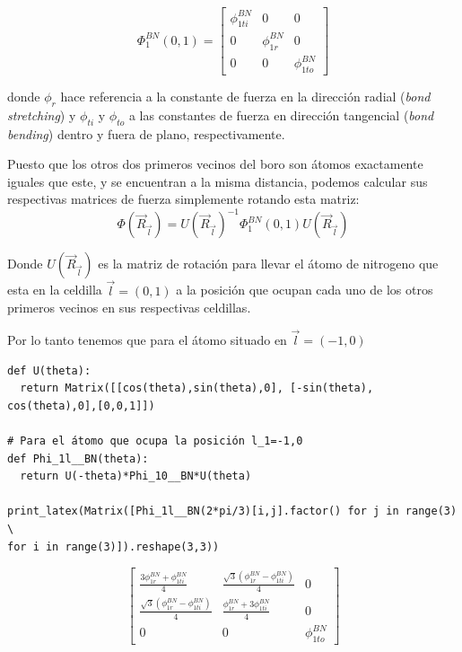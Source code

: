 \documentclass[12pt,a4paper]{article}
\begin{document}
\begin{equation}\Phi_1^{BN}(0,1)= \left[\begin{matrix}\phi^{BN}_{1ti} & 0 & 0\\0 & \phi^{BN}_{1r} & 0\\0 & 0 & \phi^{BN}_{1to}\end{matrix}\right] \end{equation}
\vspace{0.7cm}



donde \(\phi_r\) hace referencia a la constante de fuerza en la dirección radial (\emph{bond stretching}) y \(\phi_{ti}\) y \(\phi_{to}\) a las constantes de fuerza en dirección tangencial (\emph{bond bending}) dentro y fuera de plano, respectivamente.

Puesto que los otros dos primeros vecinos del boro son átomos exactamente iguales que este, y se encuentran a la misma distancia, podemos calcular sus respectivas matrices de fuerza simplemente rotando esta matriz:
\begin{equation}
\label{eq:2}
\Phi(\vec R_{\vec l})=U(\vec R_{\vec l})^{-1}\Phi^{BN}_{1}(0,1)U(\vec R_{\vec l})
\end{equation}

Donde \(U(\vec R_{\vec l})\) es la matriz de rotación para llevar el átomo de nitrogeno que esta en la celdilla \(\vec l=(0, 1)\) a la posición que ocupan cada uno de los otros primeros vecinos en sus respectivas celdillas.

Por lo tanto tenemos que para el átomo situado en \(\vec l=(-1,0)\)
\begin{verbatim}
def U(theta):
  return Matrix([[cos(theta),sin(theta),0], [-sin(theta), cos(theta),0],[0,0,1]])

# Para el átomo que ocupa la posición l_1=-1,0
def Phi_1l__BN(theta):
  return U(-theta)*Phi_10__BN*U(theta)

print_latex(Matrix([Phi_1l__BN(2*pi/3)[i,j].factor() for j in range(3) \
for i in range(3)]).reshape(3,3))
\end{verbatim}

\begin{equation}
\label{eq:3}
\left[\begin{matrix}\frac{3 \phi^{BN}_{1r} + \phi^{BN}_{1ti}}{4} & \frac{\sqrt{3} \left(\phi^{BN}_{1r} - \phi^{BN}_{1ti}\right)}{4} & 0\\\frac{\sqrt{3} \left(\phi^{BN}_{1r} - \phi^{BN}_{1ti}\right)}{4} & \frac{\phi^{BN}_{1r} + 3 \phi^{BN}_{1ti}}{4} & 0\\0 & 0 & \phi^{BN}_{1to}\end{matrix}\right]
\end{equation}
\end{document}

